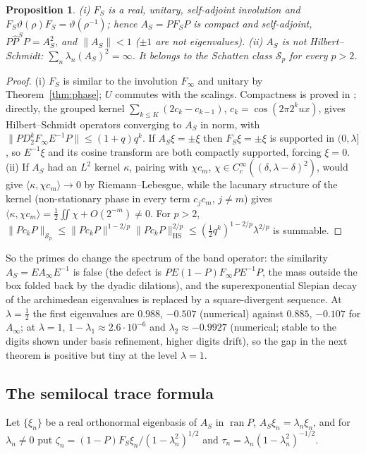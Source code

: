 \documentclass[11pt]{amsart}
\newtheorem{proposition}[theorem]{Proposition}
\theoremstyle{definition}
\theoremstyle{remark}
\newcommand{\ran}{\operatorname{ran}}
\newcommand{\Pih}{\widehat P}
\begin{document}
\begin{proposition}\label{prop:AS}
\emph{(i)} $F_S$ is a real, unitary, self-adjoint involution and $F_S\vartheta(\rho)F_S=\vartheta(\rho^{-1})$; hence
$A_S=PF_SP$ is compact and self-adjoint, $P\Pih^SP=A_S^2$, and $\|A_S\|<1$ ($\pm1$ are not eigenvalues).
\emph{(ii)} $A_S$ is not Hilbert--Schmidt: $\sum_n\lambda_n(A_S)^2=\infty$. It belongs to the Schatten class
$\mathcal S_p$ for every $p>2$.
\end{proposition}
\begin{proof}
(i) $F_S$ is similar to the involution $F_\infty$ and unitary by Theorem~\ref{thm:phase}; $U$ commutes with the scalings.
Compactness is proved in \cite[Thms.~2.1, 4.4]{CCquasi}; directly, the grouped kernel $\sum_{k\le K}(2c_k-c_{k-1})$,
$c_k=\cos(2\pi2^kux)$, gives Hilbert--Schmidt operators converging to $A_S$ in norm, with
$\|PD_2^kF_\infty E^{-1}P\|\le(1+q)q^k$. If $A_S\xi=\pm\xi$ then $F_S\xi=\pm\xi$ is supported in $(0,\lambda]$, so
$E^{-1}\xi$ and its cosine transform are both compactly supported, forcing $\xi=0$.
(ii) If $A_S$ had an $L^2$ kernel $\kappa$, pairing with $\chi c_m$, $\chi\in C_c^\infty((\delta,\lambda-\delta)^2)$, would
give $\langle\kappa,\chi c_m\rangle\to0$ by Riemann--Lebesgue, while the lacunary structure of the kernel (non-stationary phase
in every term $c_jc_m$, $j\ne m$) gives $\langle\kappa,\chi c_m\rangle=\frac12\iint\chi+O(2^{-m})\ne0$. For $p>2$,
$\|Pc_kP\|_{\mathcal S_p}\le\|Pc_kP\|^{1-2/p}\|Pc_kP\|_{\mathrm{HS}}^{2/p}\le(\tfrac12q^k)^{1-2/p}\lambda^{2/p}$ is summable.
\end{proof}

So the primes do change the spectrum of the band operator: the similarity $A_S=EA_\infty E^{-1}$ is false
(the defect is $PE(1-P)F_\infty PE^{-1}P$, the mass outside the box folded back by the dyadic dilations), and the
superexponential Slepian decay of the archimedean eigenvalues is replaced by a square-divergent sequence. At
$\lambda=\frac12$ the first eigenvalues are $0.988$, $-0.507$ (numerical) against $0.885$, $-0.107$ for $A_\infty$;
at $\lambda=1$, $1-\lambda_1\approx2.6\cdot10^{-6}$ and $\lambda_2\approx-0.9927$ (numerical; stable to the digits shown under basis refinement, higher digits drift),
so the gap in the next theorem is positive but tiny at the level $\lambda=1$.

\subsection{The semilocal trace formula}
Let $\{\xi_n\}$ be a real orthonormal eigenbasis of $A_S$ in $\ran P$, $A_S\xi_n=\lambda_n\xi_n$, and for $\lambda_n\ne0$
put $\zeta_n=(1-P)F_S\xi_n/(1-\lambda_n^2)^{1/2}$ and $\tau_n=\lambda_n(1-\lambda_n^2)^{-1/2}$.
\end{document}
